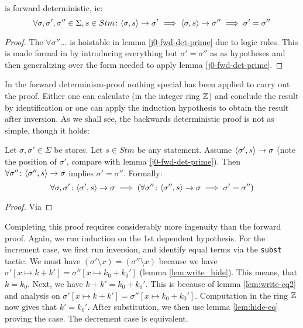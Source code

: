 \begin{thm}
\label{thm:j0-fwd-det}
  \janusz{} is forward deterministic, ie:
  \begin{equation*}
    \forall \sigma, \sigma', \sigma'' \in \Sigma, s \in Stm \colon
    \langle \sigma, s \rangle ->
    \sigma' \implies \langle \sigma, s \rangle -> \sigma''
    \implies \sigma' = \sigma''
  \end{equation*}
\end{thm}
\begin{proof}
  The $\forall \sigma''...$ is hoistable in lemma
  \eqref{j0-fwd-det-prime} due to logic rules. This is made formal in
  \coq{} by introducing everything but $\sigma' = \sigma''$ as as
  hypotheses and then generalizing over the form needed to apply lemma
  \eqref{j0-fwd-det-prime}.
\end{proof}

In the forward determinism-proof nothing special has been applied to
carry out the proof. Either one can calculate (in the integer ring
$\mathbb{Z}$) and conclude the result by identification or one can apply the
induction hypothesis to obtain the result after inversion. As we shall
see, the backwards deterministic proof is not as simple, though it
holds:

\begin{lem}
  Let $\sigma, \sigma' \in \Sigma$ be stores. Let $s \in Stm$ be any
  statement. Assume $\langle \sigma', s \rangle -> \sigma$ (note the position of
  $\sigma'$, compare with lemma \eqref{j0-fwd-det-prime}). Then
  $\forall \sigma'' \colon \langle \sigma'', s \rangle -> \sigma$ implies $\sigma' =
  \sigma''$. Formally:
  \begin{equation*}
    \forall \sigma, \sigma' \colon \langle \sigma', s \rangle -> \sigma \implies
    (\forall \sigma'' \colon \langle \sigma'', s \rangle -> \sigma \implies \sigma'
    = \sigma'')
  \end{equation*}
\end{lem}
\begin{proof}
  Via \coq{}
\end{proof}

Completing this proof requires considerably more ingenuity than the
forward proof. Again, we run induction on the 1st dependent
hypothesis. For the increment case, we first run inversion, and
identify equal terms via the \texttt{subst} tactic. We must have
$(\sigma' \setminus x) = (\sigma'' \setminus x)$ because we have
$\sigma'[x \mapsto k + k'] = \sigma''[x \mapsto k_0 + k_0']$ (lemma
\eqref{lem:write_hide}). This means, that $k = k_0$. Next, we have $k
+ k' = k_0 + k_0'$. This is because of lemma \eqref{lem:write-eq2} and
analysis on $\sigma'[x \mapsto k + k'] = \sigma''[x \mapsto k_0 +
k_0']$. Computation in the ring $\mathbb{Z}$ now gives that $k' =
k_0'$. After substitution, we then use lemma \eqref{lem:hide-eq}
proving the case. The decrement case is equivalent.

